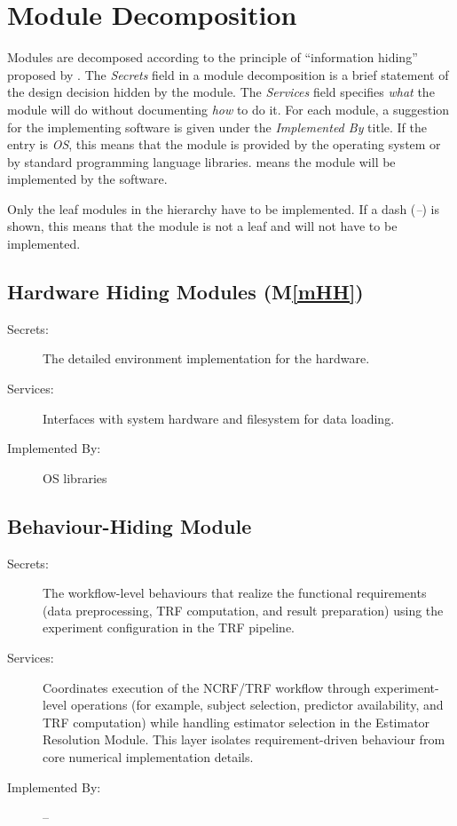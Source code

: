 \documentclass[12pt, titlepage]{article}
\newcommand{\mref}[1]{M\ref{#1}}
\begin{document}
\section{Module Decomposition} \label{SecMD}

Modules are decomposed according to the principle of ``information hiding''
proposed by \citet{ParnasEtAl1984}. The \emph{Secrets} field in a module
decomposition is a brief statement of the design decision hidden by the
module. The \emph{Services} field specifies \emph{what} the module will do
without documenting \emph{how} to do it. For each module, a suggestion for the
implementing software is given under the \emph{Implemented By} title. If the
entry is \emph{OS}, this means that the module is provided by the operating
system or by standard programming language libraries.  \emph{\progname{}} means the
module will be implemented by the \progname{} software.

Only the leaf modules in the hierarchy have to be implemented. If a dash
(\emph{--}) is shown, this means that the module is not a leaf and will not have
to be implemented.

\subsection{Hardware Hiding Modules (\mref{mHH})}

\begin{description}
\item[Secrets:]The detailed environment implementation for the hardware.
\item[Services:] Interfaces with system hardware and filesystem for data loading.
\item[Implemented By:] OS libraries
\end{description}

\subsection{Behaviour-Hiding Module}

\begin{description}
\item[Secrets:]The workflow-level behaviours that realize the functional
  requirements (data preprocessing, TRF computation, and result preparation)
  using the experiment configuration in the TRF pipeline.
\item[Services:]Coordinates execution of the NCRF/TRF workflow through
  experiment-level operations (for example, subject selection, predictor
  availability, and TRF computation) while handling estimator selection in the
  Estimator Resolution Module. This layer isolates requirement-driven behaviour
  from core numerical implementation details.
\item[Implemented By:] --
\end{description}
\end{document}

